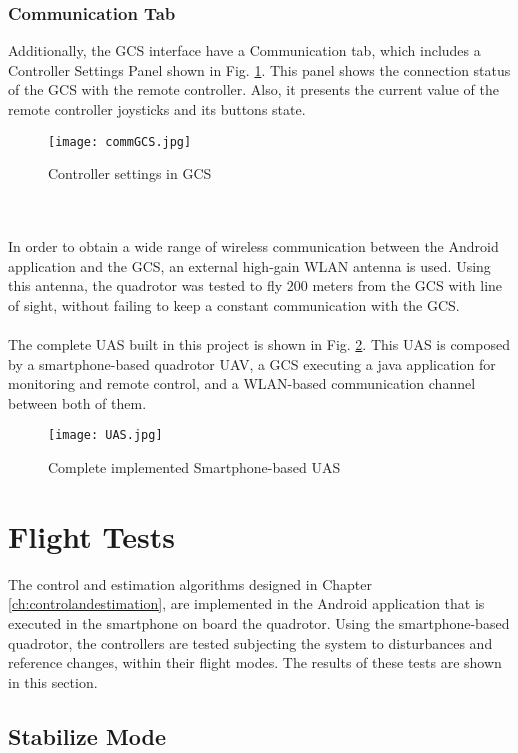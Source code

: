 \subsubsection*{Communication Tab}
Additionally, the GCS interface have a Communication tab, which includes a Controller Settings Panel shown in Fig. \ref{fig:commGCS}. This panel shows the connection status of the GCS with the remote controller. Also, it presents the current value of the remote controller joysticks and its buttons state.
\begin{figure}[h]
\begin{center}
\texttt{[image: commGCS.jpg]}  
\caption{Controller settings in GCS} 
\label{fig:commGCS}
\end{center}
\end{figure}
\\\\
In order to obtain a wide range of wireless communication between the Android application and the GCS, an external high-gain WLAN antenna is used. Using this antenna, the quadrotor was tested to fly $200$ meters from the GCS with line of sight, without failing to keep a constant communication with the GCS.
\\\\
The complete UAS built in this project is shown in Fig. \ref{fig:UAS}. This UAS is composed by a smartphone-based quadrotor UAV, a GCS executing a java application for monitoring and remote control, and a WLAN-based communication channel between both of them.
\begin{figure}[h]
\begin{center}
\texttt{[image: UAS.jpg]}  
\caption{Complete implemented Smartphone-based UAS} 
\label{fig:UAS}
\end{center}
\end{figure}

\section{Flight Tests} \label{sec:tests}
The control and estimation algorithms designed in Chapter \ref{ch:controlandestimation}, are implemented in the Android application that is executed in the smartphone on board the quadrotor. Using the smartphone-based quadrotor, the controllers are tested subjecting the system to disturbances and reference changes, within their flight modes. The results of these tests are shown in this section.

\subsection{Stabilize Mode}

